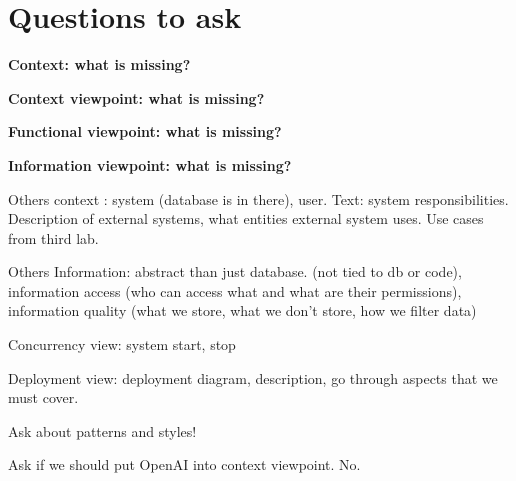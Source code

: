 \documentclass[a4paper,12pt]{article}
\begin{document}
\tableofcontents
\newpage

\section{Questions to ask}

\textbf{Context: what is missing?}

\textbf{Context viewpoint: what is missing?}

\textbf{Functional viewpoint: what is missing?}

\textbf{Information viewpoint: what is missing?}

Others context : system (database is in there), user. Text: system responsibilities. Description of external systems, what entities external system uses. Use cases from third lab.

Others Information: abstract than just database. (not tied to db or code), information access (who can access what and what are their permissions), information quality (what we store, what we don't store, how we filter data)

Concurrency view: system start, stop

Deployment view: deployment diagram, description, go through aspects that we must cover.

Ask about patterns and styles!

Ask if we should put OpenAI into context viewpoint. No.







\listoffigures
\end{document}
